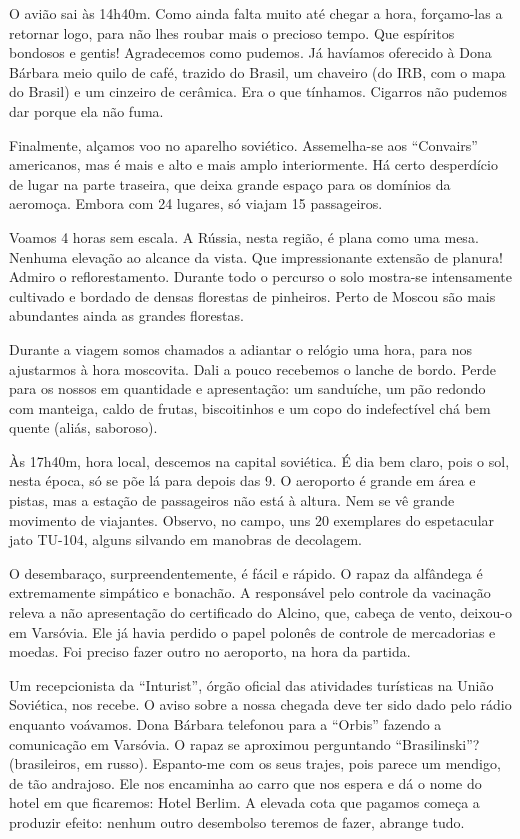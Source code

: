 O avião sai às 14h40m. Como ainda falta muito até chegar a hora, forçamo-las a retornar logo, para não lhes roubar mais o precioso tempo. Que espíritos bondosos e gentis! Agradecemos como pudemos. Já havíamos oferecido à Dona Bárbara meio quilo de café, trazido do Brasil, um chaveiro (do IRB, com o mapa do Brasil) e um cinzeiro de cerâmica. Era o que tínhamos. Cigarros não pudemos dar porque ela não fuma.

Finalmente, alçamos voo no aparelho soviético. Assemelha-se aos ``Convairs'' americanos, mas é mais e alto e mais amplo interiormente. Há certo desperdício de lugar na parte traseira, que deixa grande espaço para os domínios da aeromoça. Embora com 24 lugares, só viajam 15 passageiros.

Voamos 4 horas sem escala. A Rússia, nesta região, é plana como uma mesa. Nenhuma elevação ao alcance da vista. Que impressionante extensão de planura! Admiro o reflorestamento. Durante todo o percurso o solo mostra-se intensamente cultivado e bordado de densas florestas de pinheiros. Perto de Moscou são mais abundantes ainda as grandes florestas.

Durante a viagem somos chamados a adiantar o relógio uma hora, para nos ajustarmos à hora moscovita. Dali a pouco recebemos o lanche de bordo. Perde para os nossos em quantidade e apresentação: um sanduíche, um pão redondo com manteiga, caldo de frutas, biscoitinhos e um copo do indefectível chá bem quente (aliás, saboroso).

Às 17h40m, hora local, descemos na capital soviética. É dia bem claro, pois o sol, nesta época, só se põe lá para depois das 9. O aeroporto é grande em área e pistas, mas a estação de passageiros não está à altura. Nem se vê grande movimento de viajantes. Observo, no campo, uns 20 exemplares do espetacular jato TU-104, alguns silvando em manobras de decolagem.

O desembaraço, surpreendentemente, é fácil e rápido. O rapaz da alfândega é extremamente simpático e bonachão. A responsável pelo controle da vacinação releva a não apresentação do certificado do Alcino, que, cabeça de vento, deixou-o em Varsóvia. Ele já havia perdido o papel polonês de controle de mercadorias e moedas. Foi preciso fazer outro no aeroporto, na hora da partida.

Um recepcionista da ``Inturist'', órgão oficial das atividades turísticas na União Soviética, nos recebe. O aviso sobre a nossa chegada deve ter sido dado pelo rádio enquanto voávamos. Dona Bárbara telefonou para a ``Orbis'' fazendo a comunicação em Varsóvia. O rapaz se aproximou perguntando ``Brasilinski''? (brasileiros, em russo). Espanto-me com os seus trajes, pois parece um mendigo, de tão andrajoso. Ele nos encaminha ao carro que nos espera e dá o nome do hotel em que ficaremos: Hotel Berlim. A elevada cota que pagamos começa a produzir efeito: nenhum outro desembolso teremos de fazer, abrange tudo.

